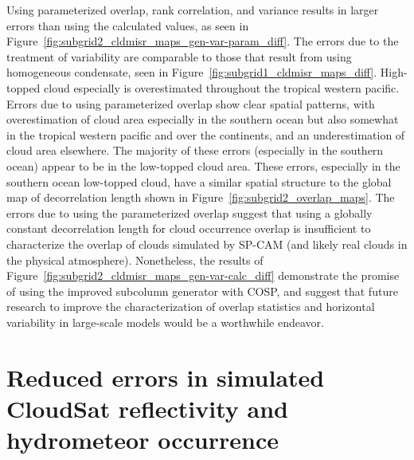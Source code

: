 Using parameterized overlap, rank correlation, and variance results in
larger errors than using the calculated values, as seen in
Figure~\ref{fig:subgrid2_cldmisr_maps_gen-var-param_diff}. The errors
due to the treatment of variability are comparable to those that result
from using homogeneous condensate, seen in
Figure~\ref{fig:subgrid1_cldmisr_maps_diff}. High-topped cloud
especially is overestimated throughout the tropical western pacific.
Errors due to using parameterized overlap show clear spatial patterns,
with overestimation of cloud area especially in the southern ocean but
also somewhat in the tropical western pacific and over the continents,
and an underestimation of cloud area elsewhere. The majority of these
errors (especially in the southern ocean) appear to be in the low-topped
cloud area. These errors, especially in the southern ocean low-topped
cloud, have a similar spatial structure to the global map of
decorrelation length shown in Figure~\ref{fig:subgrid2_overlap_maps}.
The errors due to using the parameterized overlap suggest that using a
globally constant decorrelation length for cloud occurrence overlap is
insufficient to characterize the overlap of clouds simulated by SP-CAM
(and likely real clouds in the physical atmosphere). Nonetheless, the
results of Figure~\ref{fig:subgrid2_cldmisr_maps_gen-var-calc_diff}
demonstrate the promise of using the improved subcolumn generator with
COSP, and suggest that future research to improve the characterization
of overlap statistics and horizontal variability in large-scale models
would be a worthwhile endeavor.

\section{Reduced errors in simulated CloudSat reflectivity and
hydrometeor occurrence}\label{sec:subgrid2Active}

